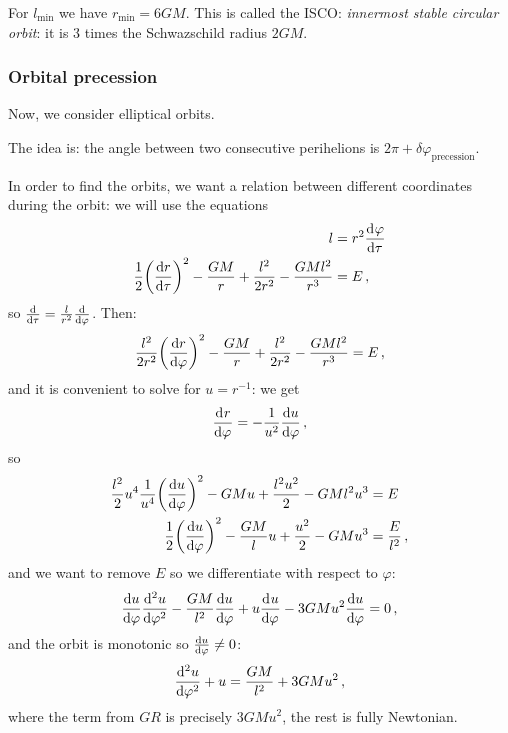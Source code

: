 \documentclass[main.tex]{subfiles}
\begin{document}
For \(l _{\text{min}}\) we have \(r _{\text{min}} = 6 GM\).
This is called the ISCO: \emph{innermost stable circular orbit}: it is \(3\) times the Schwazschild radius \(2GM\).

\subsubsection{Orbital precession}

Now, we consider elliptical orbits.

The idea is: the angle between two consecutive perihelions is \(2\pi + \delta \varphi _{\text{precession}}\).

In order to find the orbits, we want a relation between different coordinates during the orbit: we will use the equations 
%
\begin{subequations}
\begin{align}
  l &= r^2 \dv[]{\varphi }{\tau }  \\
  \frac{1}{2}\qty(\dv{r}{\tau })^2 - \frac{GM}{r} + \frac{l^2}{2r^2} - \frac{GMl^2}{r^3} &= E 
\,,
\end{align}
\end{subequations}
%
so \(\dv{}{\tau } = \frac{l}{r^2} \dv{}{\varphi }\). Then: 
%
\begin{align}
  \frac{l^2}{2 r^2} \qty(\dv{r}{\varphi })^2 - \frac{GM}{r} + \frac{l^2}{2r^2} - \frac{GMl^2}{r^3} = E
\,,
\end{align}
%
and it is convenient to solve for \(u = r^{-1}\): we get 
%
\begin{align}
  \dv[]{r}{\varphi } = - \frac{1}{u^2} \dv{u }{\varphi }
\,,
\end{align}
%
so 
%
\begin{subequations}
\begin{align}
  \frac{l^2}{2} u^{4} \frac{1}{ u^{4 }} \qty(\dv{u}{\varphi })^2 - GMu + \frac{l^2u^2}{2} - GMl^2u^3 &= E \\
  \frac{1}{2}\qty(\dv{u}{\varphi })^2 - \frac{GM}{l} u + \frac{u^2}{2} - GMu^3 &= \frac{E}{l^2}
\,,
\end{align}
\end{subequations}
%
and we want to remove \(E\) so we differentiate with respect to \(\varphi \): 
%
\begin{align}
  \dv{u }{\varphi } \dv[2]{u}{\varphi } - \frac{GM}{l^2} \dv{u}{\varphi } + u \dv[]{u}{\varphi } - 3GM u^2 \dv{u}{\varphi } = 0
\,,
\end{align}
%
and the orbit is monotonic so \(\dv{u}{\varphi } \neq 0\): 
%
\begin{align}
  \dv[2]{u}{\varphi } + u = \frac{GM}{l^2} + 3GMu^2
\,,
\end{align}
%
where the term from \(GR\) is precisely \(3GMu^2\), the rest is fully Newtonian.
\end{document}
